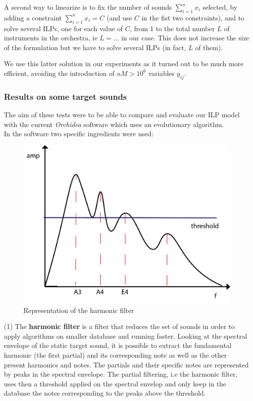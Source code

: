\documentclass[a4paper]{book}
\begin{document}
A second way to linearize is to fix the number of sounds $\sum_{i=1}^n x_i$ selected, by adding a constraint $\sum_{i=1}^n x_i=C$ (and use $C$ in the fist two constraints), and to solve several ILPs, one for each value of $C$, from 1 to the total number $L$ of instruments in the orchestra, ie $L=...$ in our case. This  does not increase the size of the formulation but we have to solve several ILPs (in fact, $L$ of them). 

We use this latter solution in our experiments as it turned out to be much more efficient, avoiding the introduction of $nM>10^6$ variables $y_{ij}$.


\subsubsection{Results on some target sounds}


The aim of these tests were to be able to compare and evaluate our ILP model with the current \textit{Orchidea} software which uses an evolutionary algorithm.\\
In the software two specific ingredients were used:
\begin{figure}[!h]
    \centering
    \includegraphics[scale=0.3]{harmofilter.png}
    \caption{Representation of the harmonic filter}
    \label{fig:harmofilter}
\end{figure}

(1) The \textbf{harmonic filter} is a filter that reduces the set of sounds in order to apply algorithms on smaller database and running faster. Looking at the spectral envelope of the static target sound, it is possible to extract the fundamental harmonic (the first partial) and its corresponding note as well as the other present harmonics and notes. The partials and their specific notes are represented by peaks in the spectral envelope. The partial filtering, i.e the harmonic filter, uses then a threshold applied on the spectral envelop and only keep in the database the notes corresponding to the peaks above the threshold. \\
\end{document}
